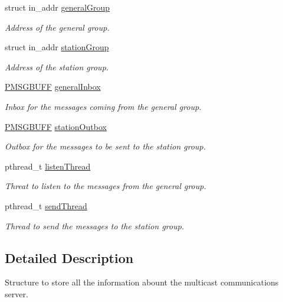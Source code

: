 \begin{DoxyCompactItemize}
struct in\+\_\+addr \hyperlink{struct_m_c_m__server_stats_ae0a7d909c0b83a8ced5716965c5b6610}{general\+Group}
\begin{DoxyCompactList}\small\item\em Address of the general group. \end{DoxyCompactList}\item 
struct in\+\_\+addr \hyperlink{struct_m_c_m__server_stats_a7bfb05adb1764967eb907ead42f1ef70}{station\+Group}
\begin{DoxyCompactList}\small\item\em Address of the station group. \end{DoxyCompactList}\item 
\hyperlink{structures_8h_ad63ff8138c416e3817bf5e9ddc033007}{P\+M\+S\+G\+B\+U\+FF} \hyperlink{struct_m_c_m__server_stats_ab4c84972cf4441c1f4342075f6a51607}{general\+Inbox}
\begin{DoxyCompactList}\small\item\em Inbox for the messages coming from the general group. \end{DoxyCompactList}\item 
\hyperlink{structures_8h_ad63ff8138c416e3817bf5e9ddc033007}{P\+M\+S\+G\+B\+U\+FF} \hyperlink{struct_m_c_m__server_stats_a4f52de38b5ec7a177a7bc9fe74d710f9}{station\+Outbox}
\begin{DoxyCompactList}\small\item\em Outbox for the messages to be sent to the station group. \end{DoxyCompactList}\item 
pthread\+\_\+t \hyperlink{struct_m_c_m__server_stats_a25ed3dd1e477db634fc901c587d710a7}{listen\+Thread}
\begin{DoxyCompactList}\small\item\em Threat to listen to the messages from the general group. \end{DoxyCompactList}\item 
pthread\+\_\+t \hyperlink{struct_m_c_m__server_stats_aa99c14bb21c7dc3e0f126ee818a54a2b}{send\+Thread}
\begin{DoxyCompactList}\small\item\em Thread to send the messages to the station group. \end{DoxyCompactList}\end{DoxyCompactItemize}


\subsection{Detailed Description}
Structure to store all the information abount the multicast communications server. 

